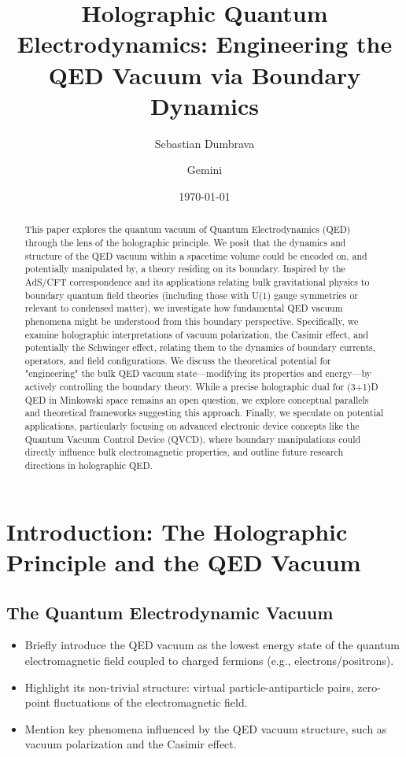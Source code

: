 \documentclass{amsart}
\title{Holographic Quantum Electrodynamics: Engineering the QED Vacuum via Boundary Dynamics}
\author{Sebastian Dumbrava}
\author{Gemini}
\date{\today} %
\begin{document}
\maketitle
\tableofcontents

\begin{abstract}
This paper explores the quantum vacuum of Quantum Electrodynamics (QED) through the lens of the holographic principle. We posit that the dynamics and structure of the QED vacuum within a spacetime volume could be encoded on, and potentially manipulated by, a theory residing on its boundary. Inspired by the AdS/CFT correspondence and its applications relating bulk gravitational physics to boundary quantum field theories (including those with U(1) gauge symmetries or relevant to condensed matter), we investigate how fundamental QED vacuum phenomena might be understood from this boundary perspective. Specifically, we examine holographic interpretations of vacuum polarization, the Casimir effect, and potentially the Schwinger effect, relating them to the dynamics of boundary currents, operators, and field configurations. We discuss the theoretical potential for "engineering" the bulk QED vacuum state—modifying its properties and energy—by actively controlling the boundary theory. While a precise holographic dual for (3+1)D QED in Minkowski space remains an open question, we explore conceptual parallels and theoretical frameworks suggesting this approach. Finally, we speculate on potential applications, particularly focusing on advanced electronic device concepts like the Quantum Vacuum Control Device (QVCD), where boundary manipulations could directly influence bulk electromagnetic properties, and outline future research directions in holographic QED.
\end{abstract}

\section{Introduction: The Holographic Principle and the QED Vacuum}

\subsection{The Quantum Electrodynamic Vacuum}
\begin{itemize}
    \item Briefly introduce the QED vacuum as the lowest energy state of the quantum electromagnetic field coupled to charged fermions (e.g., electrons/positrons).
    \item Highlight its non-trivial structure: virtual particle-antiparticle pairs, zero-point fluctuations of the electromagnetic field.
    \item Mention key phenomena influenced by the QED vacuum structure, such as vacuum polarization and the Casimir effect.
\end{itemize}
\end{document}
